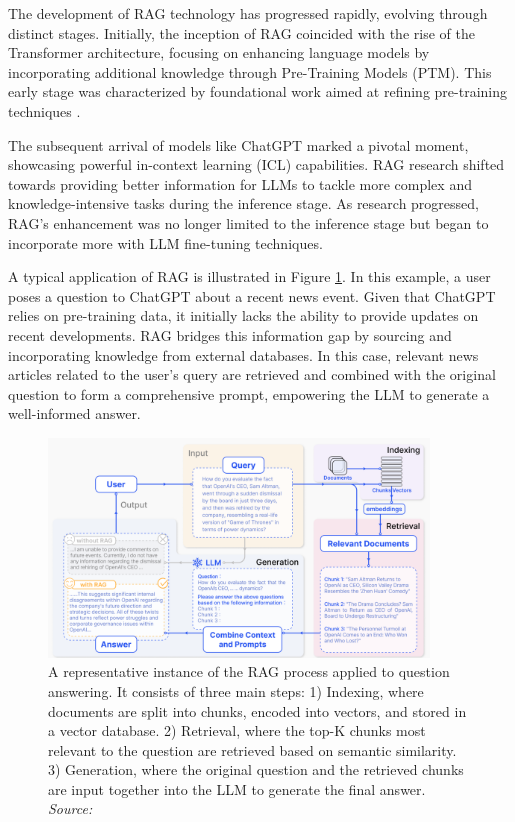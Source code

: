 The development of RAG technology has progressed rapidly, evolving through distinct stages. Initially, the inception of RAG coincided with the rise of the Transformer architecture, focusing on enhancing language models by incorporating additional knowledge through Pre-Training Models (PTM). This early stage was characterized by foundational work aimed at refining pre-training techniques \cite{arora2023gar, lewis2020retrieval, borgeaud2022improving}. 

The subsequent arrival of models like ChatGPT marked a pivotal moment, showcasing powerful in-context learning (ICL) capabilities. RAG research shifted towards providing better information for LLMs to tackle more complex and knowledge-intensive tasks during the inference stage. As research progressed, RAG's enhancement was no longer limited to the inference stage but began to incorporate more with LLM fine-tuning techniques.

A typical application of RAG is illustrated in Figure \ref{fig:rag_example}. In this example, a user poses a question to ChatGPT about a recent news event. Given that ChatGPT relies on pre-training data, it initially lacks the ability to provide updates on recent developments. RAG bridges this information gap by sourcing and incorporating knowledge from external databases. In this case, relevant news articles related to the user's query are retrieved and combined with the original question to form a comprehensive prompt, empowering the LLM to generate a well-informed answer.

\begin{figure}[h]
    \centering
    \includegraphics[width=0.9\textwidth]{images/llms/rag-strategies.png}
    \caption{A representative instance of the RAG process applied to question answering. It consists of three main steps: 1) Indexing, where documents are split into chunks, encoded into vectors, and stored in a vector database. 2) Retrieval, where the top-K chunks most relevant to the question are retrieved based on semantic similarity. 3) Generation, where the original question and the retrieved chunks are input together into the LLM to generate the final answer. \textit{Source:} \cite{gao2023retrieval}}
    \label{fig:rag_example}
\end{figure}

